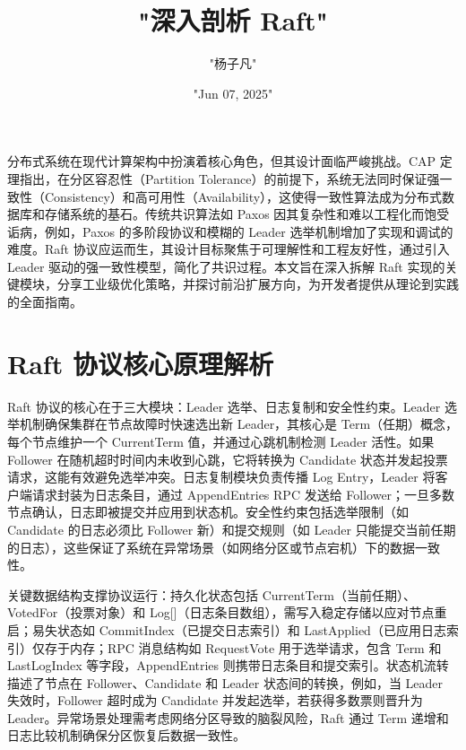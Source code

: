 \title{"深入剖析 Raft"}
\author{"杨子凡"}
\date{"Jun 07, 2025"}
\maketitle
分布式系统在现代计算架构中扮演着核心角色，但其设计面临严峻挑战。CAP 定理指出，在分区容忍性（Partition Tolerance）的前提下，系统无法同时保证强一致性（Consistency）和高可用性（Availability），这使得一致性算法成为分布式数据库和存储系统的基石。传统共识算法如 Paxos 因其复杂性和难以工程化而饱受诟病，例如，Paxos 的多阶段协议和模糊的 Leader 选举机制增加了实现和调试的难度。Raft 协议应运而生，其设计目标聚焦于可理解性和工程友好性，通过引入 Leader 驱动的强一致性模型，简化了共识过程。本文旨在深入拆解 Raft 实现的关键模块，分享工业级优化策略，并探讨前沿扩展方向，为开发者提供从理论到实践的全面指南。\par
\chapter{Raft 协议核心原理解析}
Raft 协议的核心在于三大模块：Leader 选举、日志复制和安全性约束。Leader 选举机制确保集群在节点故障时快速选出新 Leader，其核心是 Term（任期）概念，每个节点维护一个 CurrentTerm 值，并通过心跳机制检测 Leader 活性。如果 Follower 在随机超时时间内未收到心跳，它将转换为 Candidate 状态并发起投票请求，这能有效避免选举冲突。日志复制模块负责传播 Log Entry，Leader 将客户端请求封装为日志条目，通过 AppendEntries RPC 发送给 Follower；一旦多数节点确认，日志即被提交并应用到状态机。安全性约束包括选举限制（如 Candidate 的日志必须比 Follower 新）和提交规则（如 Leader 只能提交当前任期的日志），这些保证了系统在异常场景（如网络分区或节点宕机）下的数据一致性。\par
关键数据结构支撑协议运行：持久化状态包括 CurrentTerm（当前任期）、VotedFor（投票对象）和 Log[]（日志条目数组），需写入稳定存储以应对节点重启；易失状态如 CommitIndex（已提交日志索引）和 LastApplied（已应用日志索引）仅存于内存；RPC 消息结构如 RequestVote 用于选举请求，包含 Term 和 LastLogIndex 等字段，AppendEntries 则携带日志条目和提交索引。状态机流转描述了节点在 Follower、Candidate 和 Leader 状态间的转换，例如，当 Leader 失效时，Follower 超时成为 Candidate 并发起选举，若获得多数票则晋升为 Leader。异常场景处理需考虑网络分区导致的脑裂风险，Raft 通过 Term 递增和日志比较机制确保分区恢复后数据一致性。\par
